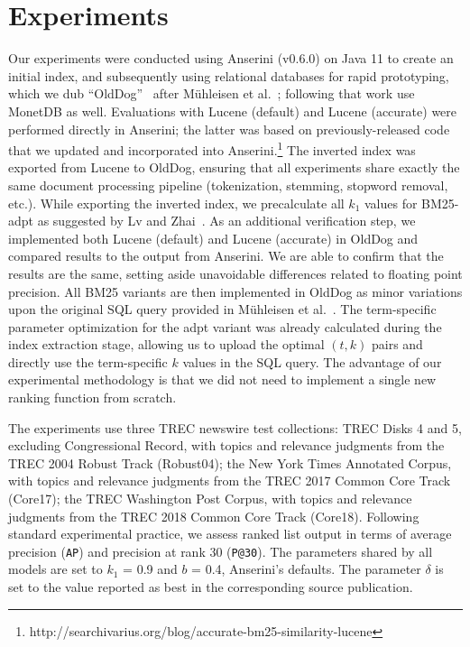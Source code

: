 \section{Experiments}
Our experiments were conducted using Anserini (v0.6.0) on Java 11 to create
an initial index, and subsequently using relational databases for rapid prototyping, which we dub ``OldDog''~\cite{olddog-docker} after M\"{u}hleisen et al.~\cite{OldDog}; following that work use MonetDB as well. Evaluations with Lucene (default) and Lucene (accurate) were performed directly in Anserini; the latter was based on previously-released code that we updated and incorporated into Anserini.\footnote{http://searchivarius.org/blog/accurate-bm25-similarity-lucene} The inverted index was exported from Lucene to OldDog, ensuring that all experiments share exactly the same document processing pipeline (tokenization, stemming, stopword removal, etc.). While exporting the inverted index, we precalculate all $k_1$ values for BM25-
adpt as suggested by Lv and Zhai~\cite{bm25-adpt}. As an additional verification step, we implemented both Lucene (default) and Lucene (accurate) in OldDog and compared results to the output from Anserini. We are able to confirm that the results are the same, setting aside unavoidable differences related to floating point precision. All BM25 variants are then implemented in OldDog as minor variations upon the original SQL query provided in M\"{u}hleisen et al.~\cite{OldDog}. The term-specific parameter optimization for the adpt variant was already calculated during the index extraction stage, allowing us to upload the optimal $(t, k)$ pairs and directly use the term-specific $k$ values in the SQL query. The advantage of our experimental methodology is that we did not need to implement a single new ranking function from scratch. %

The experiments use three TREC newswire test collections: TREC Disks 4 and 5, excluding Congressional Record, with topics and relevance judgments from the TREC 2004 Robust Track (Robust04); the New York Times Annotated Corpus, with topics and relevance judgments from the TREC 2017 Common Core Track (Core17); the TREC Washington Post Corpus, with topics and relevance judgments from the TREC 2018 Common Core Track (Core18). Following standard experimental practice, we assess ranked list output in terms of average precision (\texttt{AP}) and precision at rank 30 (\texttt{P@30}). The parameters shared by all models are set to $k_1$ = 0.9 and $b$ = 0.4, Anserini’s defaults. The parameter $\delta$ is set to the value reported as best in the corresponding source publication. 


